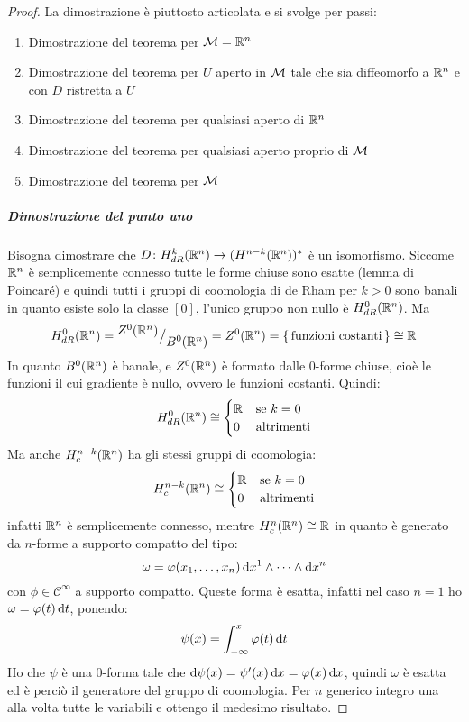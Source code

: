 \begin{proof}
  La dimostrazione è piuttosto articolata e si svolge per passi:
  \begin{enumerate}
  \item Dimostrazione del teorema per $ \mathcal{M} = \mathbb{R}^{n} $
  \item Dimostrazione del teorema per $ U $ aperto in $ \mathcal{M} $ tale che sia diffeomorfo a $ \mathbb{R}^{n} $
    e con $ D $ ristretta a $ U $
  \item Dimostrazione del teorema per qualsiasi aperto di $ \mathbb{R}^{n} $
  \item Dimostrazione del teorema per qualsiasi aperto proprio di $ \mathcal{M} $
  \item Dimostrazione del teorema per $ \mathcal{M} $
  \end{enumerate}

  \subparagraph{Dimostrazione del punto uno} Bisogna dimostrare che
  $ D \colon H^k_{dR}(\mathbb{R}^{n}) \to (H^{n-k}(\mathbb{R}^{n}))^* $ è un isomorfismo. Siccome
  $ \mathbb{R}^{n} $ è semplicemente connesso tutte le forme chiuse sono esatte (lemma
  di Poincaré) e quindi tutti i gruppi di coomologia di de Rham per $ k > 0 $
  sono banali in quanto esiste solo la classe $ [0] $, l'unico gruppo non nullo
  è $ H^0_{dR}(\mathbb{R}^{n}) $. Ma
  \[
    H^0_{dR}(\mathbb{R}^{n}) = {^{\textstyle Z^0(\mathbb{R}^{n})}\big/_{\textstyle B^0(\mathbb{R}^{n})}} = Z^0(\mathbb{R}^{n}) =
    {\set{\text{funzioni costanti}}} \cong \mathbb{R}^{}
  \]
  In quanto $ B^0(\mathbb{R}^{n}) $ è banale, e $ Z^0(\mathbb{R}^{n}) $ è formato dalle
  $ 0 $-forme chiuse, cioè le funzioni il cui gradiente è nullo, ovvero le
  funzioni costanti. Quindi:
  \[
    H^0_{dR}(\mathbb{R}^{n}) \cong
    \begin{cases}
      \mathbb{R}^{} & \text{se } k = 0 \\
      0 & \text{altrimenti}
    \end{cases}
  \]
  Ma anche $ H^{n-k}_c(\mathbb{R}^{n}) $ ha gli stessi gruppi di coomologia:
  \[
    H^{n-k}_c(\mathbb{R}^{n}) \cong
    \begin{cases}
      \mathbb{R}^{} & \text{se } k = 0 \\
      0 & \text{altrimenti}
    \end{cases}
  \]
  infatti $ \mathbb{R}^{n} $ è semplicemente connesso, mentre
  $ H^{n}_c(\mathbb{R}^{n}) \cong \mathbb{R}^{} $ in quanto è generato da $ n $-forme a supporto compatto del tipo:
  \[
    \omega = \varphi(x_1, \dots, x_n) \operatorname{d}\!{x}^1 \wedge \dots \wedge \operatorname{d}\!{x}^n
  \]
  con $ \phi \in \mathcal{C}^\infty $ a supporto compatto. Queste forma è esatta, infatti
  nel caso $ n = 1 $ ho $ \omega = \varphi(t) \operatorname{d}\!{t} $, ponendo:
  \[
    \psi(x) = \int_{-\infty}^x \varphi(t) \operatorname{d}\!{t}
  \]
  Ho che $ \psi $ è una $ 0 $-forma tale che
  $ \operatorname{d}\!{\psi} (x) = \psi'(x) \operatorname{d}\!{x} = \varphi(x) \operatorname{d}\!{x} $, quindi $ \omega $ è esatta ed è perciò il
  generatore del gruppo di coomologia. Per $ n $ generico integro una alla volta
  tutte le variabili e ottengo il medesimo risultato.


\end{proof}
